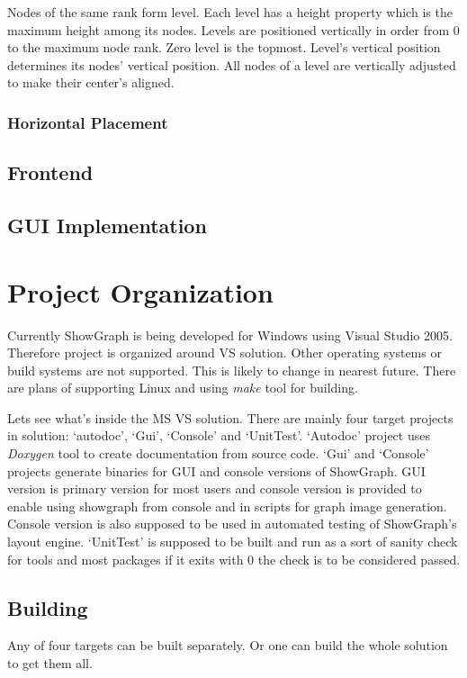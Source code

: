 \documentclass[11pt,twoside,a4paper]{article}
\begin{document}
Nodes of the same rank form level. Each level has a height property which is the maximum height among its nodes. Levels are positioned vertically in order from 0 to the maximum node rank. Zero level is the topmost. Level's vertical position determines its nodes' vertical position. All nodes of a level are vertically adjusted to make their center's aligned.

\subsubsection{Horizontal Placement}


\subsection{Frontend}


\subsection{GUI Implementation}


\section{Project Organization}
Currently ShowGraph is being developed for Windows using Visual Studio 2005. Therefore project is organized around VS solution. Other operating systems or build systems are not supported. This is likely to change in nearest future. There are plans of supporting Linux and using \emph{make} tool for building.

Lets see what's inside the MS VS solution. There are mainly four target projects in solution: `autodoc', `Gui', `Console' and `UnitTest'. `Autodoc' project uses \emph{Doxygen} tool to create documentation from source code. `Gui' and `Console' projects generate binaries for GUI and console versions of ShowGraph. GUI version is primary version for most users and console version is provided to enable using showgraph from console and in scripts for graph image generation. Console version is also supposed to be used in automated testing of ShowGraph's layout engine. `UnitTest' is supposed to be built and run as a sort of sanity check for tools and most packages if it exits with 0 the check is to be considered passed.


\subsection{Building}
Any of four targets can be built separately. Or one can build the whole solution to get them all.
\end{document}

